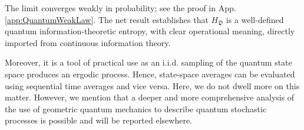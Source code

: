 \documentclass[draft,nofootinbib,pre,twocolumn,showkeys,superscriptaddress,preprintnumbers,floatfix]{revtex4-1}
\newtheorem{theorem}{Theorem}
\newcommand{\1}{\mathbbm{1}}
\newcommand{\CP}[1]{\mathbb{C}P^{#1}}
\newcommand{\DD}{\mathfrak{D}}
\newcommand{\iid}{i.i.d.\xspace}
\begin{document}
The limit converges weakly in probability; see the proof in App.
\ref{app:QuantumWeakLaw}. The net result establishes that $H_{\DD}$ is a
well-defined quantum information-theoretic entropy, with clear operational
meaning, directly imported from continuous information theory.

Moreover, it is a tool of practical use as an \iid sampling of the quantum
state space produces an ergodic process. Hence, state-space averages can be
evaluated using sequential time averages and vice versa. Here, we do not dwell
more on this matter. However, we mention that a deeper and more comprehensive
analysis of the use of geometric quantum mechanics to describe quantum
stochastic processes is possible and will be reported elsewhere.

\begin{comment}

Associated with the AEP, and relevant for the information-theoretic
interpretation of $H_{\DD}[Z]$, is the definition of the \emph{geometric
typical set} as follows:
\begin{align}
A_\epsilon^{N} \coloneqq & \Bigg\{ (Z_1,\ldots,Z_N) \in \mathcal{P}(\mathcal{H}_D)^{\otimes N} :  \nonumber \\
& \left. \,\,\, \left\vert - \frac{1}{N}\sum_{k=1}^N \log q(Z_k) - H_{\DD}[Z]\right\vert \leq \epsilon \right\}
\end{align}

Using the appropriate notion of volume, i.e. the Fubini-Study volume, the
properties of the typical set are imported, \emph{mutatis mutandis}, from
classical information theory. Again, see Ref. \cite{Cove91a}.

\begin{theorem}[Geometric Typical Set Properties]
\begin{subequations}
\begin{align}
&\mathrm{Pr}\left( A_\epsilon^N\right) \geq 1 - \epsilon, \mathrm{for} \, N\, \mathrm{sufficiently} \, \mathrm{large}~,\label{eq:TypicalA}\\
&(1-\epsilon)2^{N (H_{\DD}[Z]-\epsilon)} \leq \mathrm{Vol}\left(A^N_\epsilon \right) \leq 2^{N (H_{\DD}[Z]+\epsilon)}~,\label{eq:TypicalB}
\end{align}
\end{subequations}
where, given some set $A \subset \mathcal{P}(\mathcal{H}_D)^{\otimes N}$:
\begin{align*}
\mathrm{Vol} \left( A\right) \coloneqq \int_{\CP{d-1}} \!\!\!\! \!\!\!\! dV_{FS} \ldots \int_{\CP{d-1}} \!\!\!\! \!\!\!\! dV_{FS} \,\, \mathbf{1}_A~,
\end{align*}
and $\mathbf{1}_A$ is the indicator function which is $1$ on $A$ and zeros
otherwise.
\end{theorem}


\end{comment}
\end{document}
